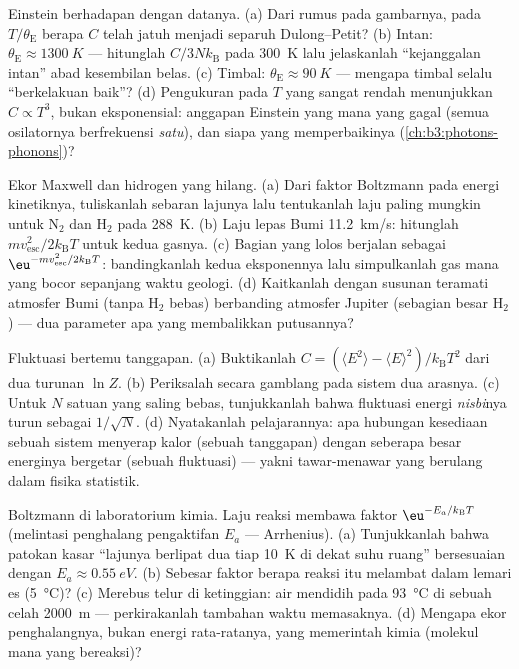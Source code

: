 \begin{exercise}[$\star\star$]\label{exo:b3:canonical-ensemble:6}
Einstein berhadapan dengan datanya. (a) Dari rumus pada gambarnya, pada
$T/\theta_{\text{E}}$ berapa $C$ telah jatuh menjadi separuh
Dulong--Petit? (b) Intan: $\theta_{\text{E}} \approx \qty{1300}{K}$ ---
hitunglah $C/3Nk_{\text{B}}$ pada \qty{300}{K} lalu jelaskanlah
``kejanggalan intan'' abad kesembilan belas. (c) Timbal: $\theta_{\text{E}}
\approx \qty{90}{K}$ --- mengapa timbal selalu ``berkelakuan baik''? (d)
Pengukuran pada $T$ yang sangat rendah menunjukkan $C \propto T^3$, bukan
eksponensial: anggapan Einstein yang mana yang gagal (semua osilatornya
berfrekuensi \emph{satu}), dan siapa yang memperbaikinya
(\cref{ch:b3:photons-phonons})?
\end{exercise}

\begin{exercise}[$\star\star$]\label{exo:b3:canonical-ensemble:7}
Ekor Maxwell dan hidrogen yang hilang. (a) Dari faktor Boltzmann pada
energi kinetiknya, tuliskanlah sebaran lajunya lalu tentukanlah laju
paling mungkin untuk N$_2$ dan H$_2$ pada \qty{288}{K}. (b)
Laju lepas Bumi \qty{11.2}{km/s}: hitunglah
$mv_{\text{esc}}^2/2k_{\text{B}}T$ untuk kedua gasnya. (c) Bagian yang
lolos berjalan sebagai $\eu^{-mv_{\text{esc}}^2/2k_{\text{B}}T}$:
bandingkanlah kedua eksponennya lalu simpulkanlah gas mana yang bocor
sepanjang waktu geologi. (d) Kaitkanlah dengan susunan teramati atmosfer
Bumi (tanpa H$_2$ bebas) berbanding atmosfer Jupiter (sebagian besar
H$_2$) --- dua parameter apa yang membalikkan putusannya?
\end{exercise}

\begin{exercise}[$\star\star$]\label{exo:b3:canonical-ensemble:8}
Fluktuasi bertemu tanggapan. (a) Buktikanlah $C = (\langle E^2\rangle -
\langle E\rangle^2)/k_{\text{B}}T^2$ dari dua turunan $\ln
Z$. (b) Periksalah secara gamblang pada sistem dua arasnya. (c) Untuk
$N$ satuan yang saling bebas, tunjukkanlah bahwa fluktuasi energi
\emph{nisbi}nya turun sebagai $1/\sqrt N$. (d) Nyatakanlah pelajarannya:
apa hubungan kesediaan sebuah sistem menyerap kalor (sebuah tanggapan)
dengan seberapa besar energinya bergetar (sebuah fluktuasi) --- yakni
tawar-menawar yang berulang dalam fisika statistik.
\end{exercise}

\begin{exercise}[$\star\star$]\label{exo:b3:canonical-ensemble:9}
Boltzmann di laboratorium kimia. Laju reaksi membawa faktor
$\eu^{-E_a/k_{\text{B}}T}$ (melintasi penghalang pengaktifan $E_a$ ---
Arrhenius). (a) Tunjukkanlah bahwa patokan kasar ``lajunya berlipat dua
tiap \qty{10}{K} di dekat suhu ruang'' bersesuaian dengan $E_a \approx
\qty{0.55}{eV}$. (b) Sebesar faktor berapa reaksi itu melambat dalam
lemari es (\qty{5}{\celsius})? (c) Merebus telur di ketinggian: air
mendidih pada \qty{93}{\celsius} di sebuah celah \qty{2000}{m} ---
perkirakanlah tambahan waktu memasaknya. (d) Mengapa ekor penghalangnya,
bukan energi rata-ratanya, yang memerintah kimia (molekul mana yang
bereaksi)?
\end{exercise}

